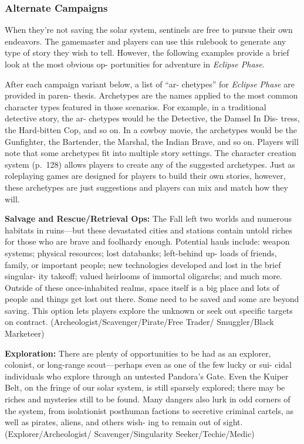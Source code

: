 \subsubsection{Alternate Campaigns}

When they're not saving the solar system, sentinels are 
free to pursue their own endeavors. The gamemaster 
and players can use this rulebook to generate any 
type of story they wish to tell. However, the following 
examples provide a brief look at the most obvious op-
portunities for adventure in \textit{Eclipse Phase}.

After each campaign variant below, a list of ``ar-
chetypes'' for \textit{Eclipse Phase} are provided in paren-
thesis. Archetypes are the names applied to the most 
common character types featured in those scenarios. 
For example, in a traditional detective story, the ar-
chetypes would be the Detective, the Damsel In Dis-
tress, the Hard-bitten Cop, and so on. In a cowboy 
movie, the archetypes would be the Gunfighter, the 
Bartender, the Marshal, the Indian Brave, and so 
on. Players will note that some archetypes fit into 
multiple story settings. The character creation system 
(p. 128) allows players to create any of the suggested 
archetypes. Just as roleplaying games are designed 
for players to build their own stories, however, these 
archetypes are just suggestions and players can mix 
and match how they will.

\textbf{Salvage and Rescue/Retrieval Ops:} The Fall left 
two worlds and numerous habitats in ruins—but 
these devastated cities and stations contain untold 
riches for those who are brave and foolhardy 
enough. Potential hauls include: weapon systems; 
physical resources; lost databanks; left-behind up-
loads of friends, family, or important people; new 
technologies developed and lost in the brief singular-
ity takeoff; valued heirlooms of immortal oligarchs; 
and much more. Outside of these once-inhabited 
realms, space itself is a big place and lots of people 
and things get lost out there. Some need to be saved 
and some are beyond saving. This option lets players 
explore the unknown or seek out specific targets on 
contract. (Archeologist/Scavenger/Pirate/Free Trader/
Smuggler/Black Marketeer)

\textbf{Exploration:} There are plenty of opportunities 
to be had as an explorer, colonist, or long-range 
scout—perhaps even as one of the few lucky or sui-
cidal individuals who explore through an untested 
Pandora's Gate. Even the Kuiper Belt, on the fringe 
of our solar system, is still sparsely explored; there 
may be riches and mysteries still to be found. Many 
dangers also lurk in odd corners of the system, from 
isolationist posthuman factions to secretive criminal 
cartels, as well as pirates, aliens, and others wish-
ing to remain out of sight. (Explorer/Archeologist/
Scavenger/Singularity Seeker/Techie/Medic)

